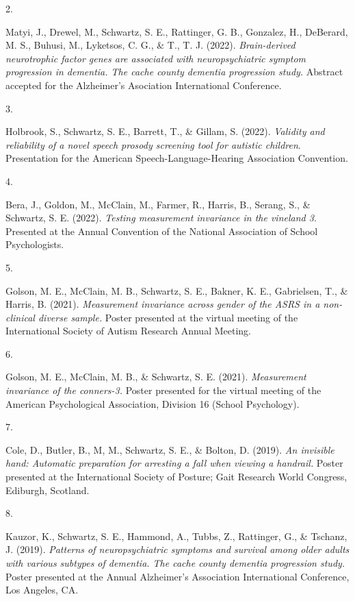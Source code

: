 \documentclass[11pt,a4paper,]{moderncv}
\newlength{\csllabelwidth}
\newcommand{\CSLLeftMargin}[1]{\parbox[t]{\csllabelwidth}{#1}}
\newcommand{\CSLRightInline}[1]{\parbox[t]{\linewidth - \csllabelwidth}{#1}}
\begin{document}
\leavevmode{}%
\CSLLeftMargin{2. }
\CSLRightInline{Matyi, J., Drewel, M., Schwartz, S. E., Rattinger, G.
B., Gonzalez, H., DeBerard, M. S., Buhusi, M., Lyketsos, C. G., \& T.,
T. J. (2022). \emph{Brain-derived neurotrophic factor genes are
associated with neuropsychiatric symptom progression in dementia. The
cache county dementia progression study.} Abstract accepted for the
Alzheimer's Asociation International Conference.}

\leavevmode{}%
\CSLLeftMargin{3. }
\CSLRightInline{Holbrook, S., Schwartz, S. E., Barrett, T., \& Gillam,
S. (2022). \emph{Validity and reliability of a novel speech prosody
screening tool for autistic children}. Presentation for the American
Speech-Language-Hearing Association Convention.}

\leavevmode{}%
\CSLLeftMargin{4. }
\CSLRightInline{Bera, J., Goldon, M., McClain, M., Farmer, R., Harris,
B., Serang, S., \& Schwartz, S. E. (2022). \emph{Testing measurement
invariance in the vineland 3}. Presented at the Annual Convention of the
National Association of School Psychologists.}

\leavevmode{}%
\CSLLeftMargin{5. }
\CSLRightInline{Golson, M. E., McClain, M. B., Schwartz, S. E., Bakner,
K. E., Gabrielsen, T., \& Harris, B. (2021). \emph{Measurement
invariance across gender of the ASRS in a non-clinical diverse sample.}
Poster presented at the virtual meeting of the International Society of
Autism Research Annual Meeting.}

\leavevmode{}%
\CSLLeftMargin{6. }
\CSLRightInline{Golson, M. E., McClain, M. B., \& Schwartz, S. E.
(2021). \emph{Measurement invariance of the conners-3.} Poster presented
for the virtual meeting of the American Psychological Association,
Division 16 (School Psychology).}

\leavevmode{}%
\CSLLeftMargin{7. }
\CSLRightInline{Cole, D., Butler, B., M, M., Schwartz, S. E., \& Bolton,
D. (2019). \emph{An invisible hand: Automatic preparation for arresting
a fall when viewing a handrail.} Poster presented at the International
Society of Posture; Gait Research World Congress, Ediburgh, Scotland.}

\leavevmode{}%
\CSLLeftMargin{8. }
\CSLRightInline{Kauzor, K., Schwartz, S. E., Hammond, A., Tubbs, Z.,
Rattinger, G., \& Tschanz, J. (2019). \emph{Patterns of neuropsychiatric
symptoms and survival among older adults with various subtypes of
dementia. The cache county dementia progression study.} Poster presented
at the Annual Alzheimer's Association International Conference, Los
Angeles, CA.}
\end{document}
